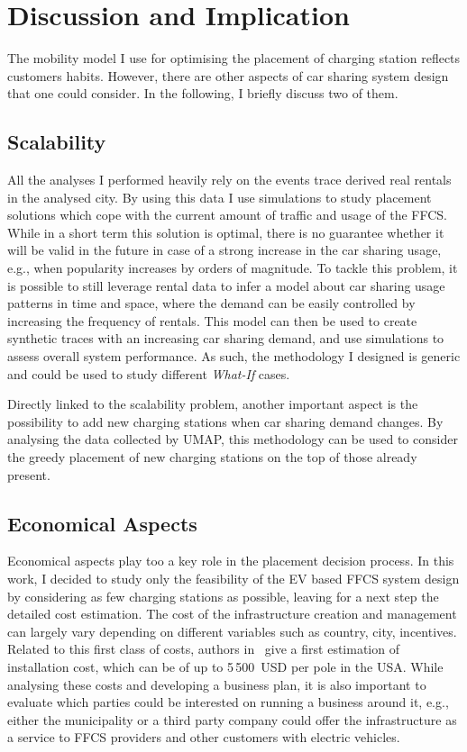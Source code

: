 \section{Discussion and Implication}
\label{sec:7_8_discussion}

The mobility model I use for optimising the placement of charging station reflects customers habits. However, there are other aspects of car sharing system design that one could consider. In the following, I briefly discuss two of them.

\subsection{\textbf{Scalability}}

All the analyses I performed heavily rely on the events trace derived real rentals in the analysed city. By using this data I use simulations to study placement solutions which cope with the current amount of traffic and usage of the FFCS. While in a short term this solution is optimal, there is no guarantee whether it will be valid in the future in case of a strong increase in the car sharing usage, e.g., when popularity increases by orders of magnitude. To tackle this problem, it is possible to still leverage rental data to infer a model about car sharing usage patterns in time and space, where the demand can be easily controlled by increasing the frequency of rentals. This model can then be used to create synthetic traces with an increasing car sharing demand, and use simulations to assess overall system performance. As such, the methodology I designed is generic and could be used to study different \textit{What-If} cases.

Directly linked to the scalability problem, another important aspect is the possibility to add new charging stations when car sharing demand changes. 
By analysing the data collected by UMAP, this methodology can be used to consider the greedy placement of new charging stations on the top of those already present.

\subsection{\textbf{Economical Aspects}}


Economical aspects play too a key role in the placement decision process. In this work, I decided to study only the feasibility of the EV based FFCS system design by considering as few charging stations as possible, leaving for a next step the detailed cost estimation. The cost of the infrastructure creation and management can largely vary depending on different variables such as country, city, incentives. 
Related to this first class of costs, authors in~\cite{USAInstallCost} give a first estimation of installation cost, which can be of up to 5\,500~USD per pole in the USA. 
While analysing these costs and developing a business plan, it is also important to evaluate which parties could be interested on running a business around it, e.g., either the municipality or a third party company could offer the infrastructure as a service to FFCS providers and other customers with electric vehicles.  

